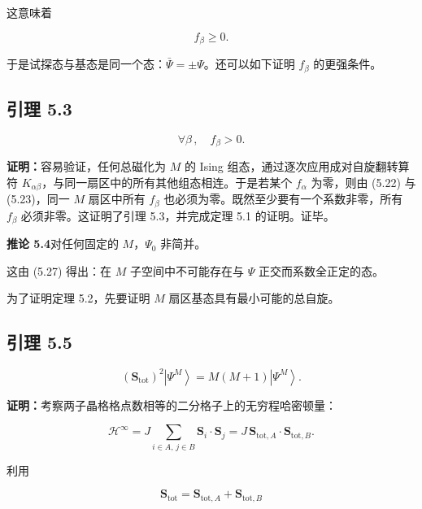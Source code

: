 这意味着

\begin{equation*}
f _ {\beta} \geq 0.
\tag{5.26}
\end{equation*}

于是试探态与基态是同一个态：$\bar{\Psi} = \pm\Psi$。还可以如下证明 $f_{\beta}$ 的更强条件。

\subsection*{引理 5.3}

\begin{equation*}
\forall \beta \, , \quad f _ {\beta} > 0.
\tag{5.27}
\end{equation*}

\textbf{证明：}容易验证，任何总磁化为 $M$ 的 Ising 组态，通过逐次应用成对自旋翻转算符 $K_{\alpha\beta}$，与同一扇区中的所有其他组态相连。于是若某个 $f_{\alpha}$ 为零，则由 (5.22) 与 (5.23)，同一 $M$ 扇区中所有 $f_{\beta}$ 也必须为零。既然至少要有一个系数非零，所有 $f_{\beta}$ 必须非零。这证明了引理 5.3，并完成定理 5.1 的证明。证毕。

\medskip
\noindent\textbf{推论 5.4}\quad 对任何固定的 $M$，$\Psi_{0}$ 非简并。
\medskip

这由 (5.27) 得出：在 $M$ 子空间中不可能存在与 $\Psi$ 正交而系数全正定的态。

为了证明定理 5.2，先要证明 $M$ 扇区基态具有最小可能的总自旋。

\subsection*{引理 5.5}

\begin{equation*}
\left( \mathbf {S} _ {\mathrm{tot}} \right) ^ {2} \left| \Psi^ {M} \right\rangle = M ( M + 1 ) \left| \Psi^ {M} \right\rangle .
\tag{5.28}
\end{equation*}

\textbf{证明：}考察两子晶格格点数相等的二分格子上的无穷程哈密顿量：

\begin{equation*}
\mathcal {H} ^ {\infty} = J \sum_ {i \in A,\, j \in B} \mathbf {S} _ {i} \cdot \mathbf {S} _ {j} = J \, \mathbf {S} _ {\mathrm{tot},A} \cdot \mathbf {S} _ {\mathrm{tot},B}.
\tag{5.29}
\end{equation*}

利用

\begin{equation*}
\mathbf {S} _ {\mathrm{tot}} = \mathbf {S} _ {\mathrm{tot},A} + \mathbf {S} _ {\mathrm{tot},B}
\tag{5.30}
\end{equation*}

